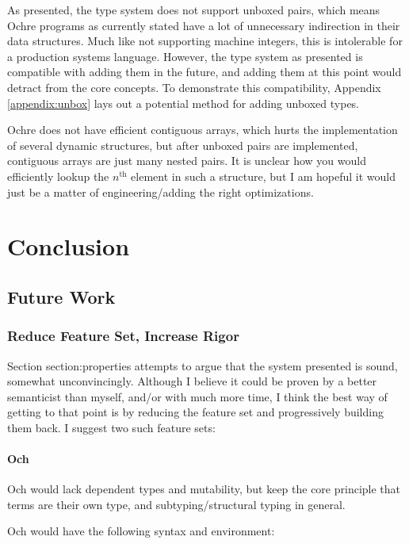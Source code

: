 \documentclass[12pt,twoside]{report}
\begin{document}
As presented, the type system does not support unboxed pairs, which means Ochre programs as currently stated have a lot of unnecessary indirection in their data structures. Much like not supporting machine integers, this is intolerable for a production systems language. However, the type system as presented is compatible with adding them in the future, and adding them at this point would detract from the core concepts. To demonstrate this compatibility, Appendix \ref{appendix:unbox} lays out a potential method for adding unboxed types.

Ochre does not have efficient contiguous arrays, which hurts the implementation of several dynamic structures, but after unboxed pairs are implemented, contiguous arrays are just many nested pairs. It is unclear how you would efficiently lookup the $n^{\text{th}}$ element in such a structure, but I am hopeful it would just be a matter of engineering/adding the right optimizations.

\chapter{Conclusion}
\section{Future Work}
\subsection{Reduce Feature Set, Increase Rigor}
Section {section:properties} attempts to argue that the system presented is sound, somewhat unconvincingly. Although I believe it could be proven by a better semanticist than myself, and/or with much more time, I think the best way of getting to that point is by reducing the feature set and progressively building them back. I suggest two such feature sets:

\subsubsection{Och}
Och would lack dependent types and mutability, but keep the core principle that terms are their own type, and subtyping/structural typing in general.

Och would have the following syntax and environment:
\end{document}
